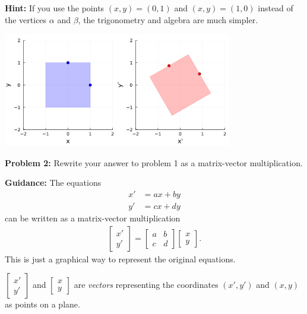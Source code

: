\documentclass[letter]{article}
\begin{document}
\newpage

\vspace{2mm}
{\bf Hint:} If you use the points $(x,y) = (0,1)$ and $(x,y) = (1,0)$ instead of the
vertices $\alpha$ and $\beta$, the trigonometry and algebra are much simpler.

\begin{center}
  \includegraphics[width=0.75\textwidth]{rotation_square_b.png}
\end{center}

\newpage

{\bf Problem 2:} Rewrite your answer to problem 1 as a matrix-vector multiplication.

\vspace{2mm}
{\bf Guidance:} The equations 
\begin{align}
  x' &= ax + by \nonumber \\      
  y' &= cx + dy         \label{linreln_algebra}
\end{align}
can be written as a matrix-vector multiplication 
\begin{align}
  \begin{bmatrix} x' \\ y' \end{bmatrix}
  =
  \begin{bmatrix} a & b \\ c & d \end{bmatrix}                       
  \begin{bmatrix} x \\ y \end{bmatrix}.  \label{linreln_matrix}
\end{align}
This is just a graphical way to represent the original equations.

\vspace{3mm}
$\begin{bmatrix} x' \\ y' \end{bmatrix}$ and $\begin{bmatrix} x \\ y \end{bmatrix}$
are {\em vectors} representing the coordinates $(x',y')$ and $(x,y)$ as points on a plane.
\end{document}
